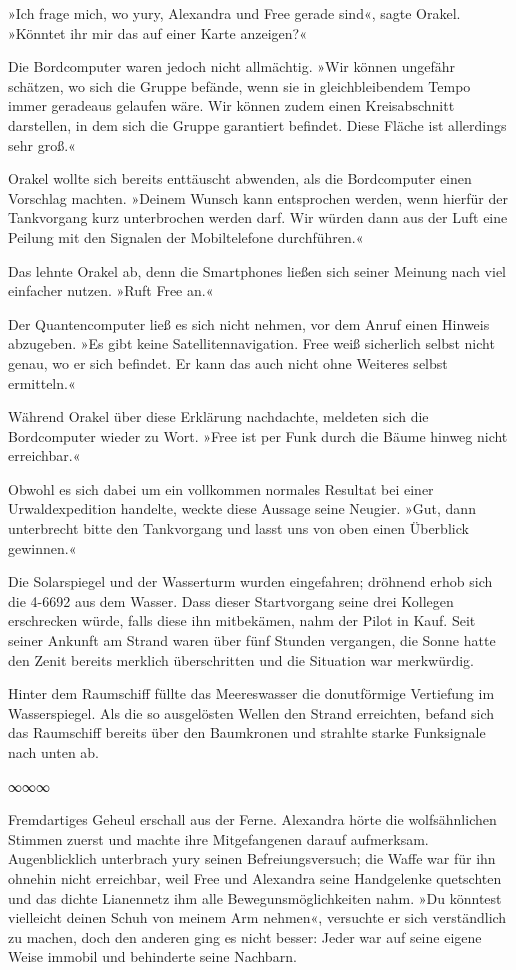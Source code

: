 »Ich frage mich, wo yury, Alexandra und Free gerade sind«, sagte Orakel. »Könntet ihr mir das auf einer Karte anzeigen?«

Die Bordcomputer waren jedoch nicht allmächtig. »Wir können ungefähr schätzen, wo sich die Gruppe befände, wenn sie in gleichbleibendem Tempo immer geradeaus gelaufen wäre. Wir können zudem einen Kreisabschnitt darstellen, in dem sich die Gruppe garantiert befindet. Diese Fläche ist allerdings sehr groß.«

Orakel wollte sich bereits enttäuscht abwenden, als die Bordcomputer einen Vorschlag machten. »Deinem Wunsch kann entsprochen werden, wenn hierfür der Tankvorgang kurz unterbrochen werden darf. Wir würden dann aus der Luft eine Peilung mit den Signalen der Mobiltelefone durchführen.«

Das lehnte Orakel ab, denn die Smartphones ließen sich seiner Meinung nach viel einfacher nutzen. »Ruft Free an.«

Der Quantencomputer ließ es sich nicht nehmen, vor dem Anruf einen Hinweis abzugeben. »Es gibt keine Satellitennavigation. Free weiß sicherlich selbst nicht genau, wo er sich befindet. Er kann das auch nicht ohne Weiteres selbst ermitteln.«

Während Orakel über diese Erklärung nachdachte, meldeten sich die Bordcomputer wieder zu Wort. »Free ist per Funk durch die Bäume hinweg nicht erreichbar.«

Obwohl es sich dabei um ein vollkommen normales Resultat bei einer Urwaldexpedition handelte, weckte diese Aussage seine Neugier. »Gut, dann unterbrecht bitte den Tankvorgang und lasst uns von oben einen Überblick gewinnen.«

Die Solarspiegel und der Wasserturm wurden eingefahren; dröhnend erhob sich die 4-6692 aus dem Wasser. Dass dieser Startvorgang seine drei Kollegen erschrecken würde, falls diese ihn mitbekämen, nahm der Pilot in Kauf. Seit seiner Ankunft am Strand waren über fünf Stunden vergangen, die Sonne hatte den Zenit bereits merklich überschritten und die Situation war merkwürdig.

Hinter dem Raumschiff füllte das Meereswasser die donutförmige Vertiefung im Wasserspiegel. Als die so ausgelösten Wellen den Strand erreichten, befand sich das Raumschiff bereits über den Baumkronen und strahlte starke Funksignale nach unten ab.

\begin{center}
∞∞∞
\end{center}

Fremdartiges Geheul erschall aus der Ferne. Alexandra hörte die wolfsähnlichen Stimmen zuerst und machte ihre Mitgefangenen darauf aufmerksam. Augenblicklich unterbrach yury seinen Befreiungsversuch; die Waffe war für ihn ohnehin nicht erreichbar, weil Free und Alexandra seine Handgelenke quetschten und das dichte Lianennetz ihm alle Bewegunsmöglichkeiten nahm. »Du könntest vielleicht deinen Schuh von meinem Arm nehmen«, versuchte er sich verständlich zu machen, doch den anderen ging es nicht besser: Jeder war auf seine eigene Weise immobil und behinderte seine Nachbarn.


